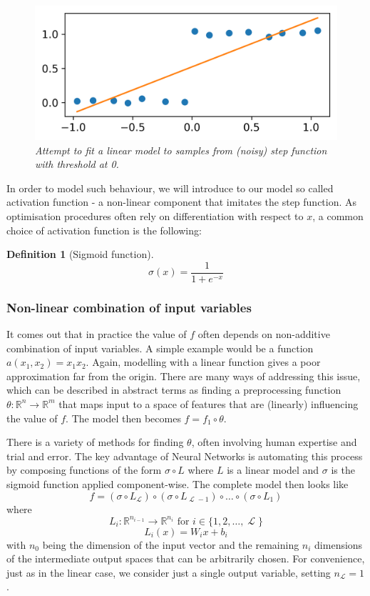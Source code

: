 \documentclass[a4paper,11pt]{article}
\theoremstyle{break}
\newtheorem{definition}{Definition}[section]
\newcommand{\R}{\mathbb{R}}
\DeclareMathOperator{\La}{\mathcal{L}}
\begin{document}
\begin{figure}[bph]
    \centering
    \includegraphics[width=0.4\linewidth]{step_linfit.png}
    \caption{\textit{Attempt to fit a linear model to samples from (noisy) step function with threshold at 0.}}
\end{figure}

In order to model such behaviour, we will introduce to our model so called activation function - a non-linear component  that imitates the step function. As optimisation procedures often rely on differentiation with respect to $x$, a common choice of activation function is the following:

\begin{definition}[Sigmoid function]
    $$ \sigma(x) = \frac{1}{1 + e^{-x}}$$
\end{definition}

 
\subsubsection{Non-linear combination of input variables}
It comes out that in practice the value of $f$ often depends on non-additive combination of input variables. A simple example would be a function $a(x_1, x_2) = x_1 x_2$. Again, modelling with a linear function gives a poor approximation far from the origin.
There are many ways of addressing this issue, which can be described in abstract terms as finding a preprocessing function $ \theta : \R^n \to \R^m$ that maps input to a space of features that are (linearly) influencing the value of $f$. The model then becomes $ f = f_1 \circ \theta $.

There is a variety of methods for finding $\theta$, often involving human expertise and trial and error. The key advantage of Neural Networks is automating this process by composing functions of the form $ \sigma \circ L$ where $L$ is a linear model and $\sigma$ is the sigmoid function applied component-wise.
The complete model then looks like
$$ f = (\sigma \circ L_{\La}) \circ (\sigma \circ L_{\La - 1}) \circ \ldots \circ (\sigma \circ L_{1}) $$
where
$$ L_i : \R^{n_{i-1}} \to \R^{n_{i}} \text{ for } i \in \{1, 2, \ldots, \La \} $$
$$ L_i(x) = W_i x + b_i $$
with $ n_0 $ being the dimension of the input vector and the remaining $ n_i $ dimensions of the intermediate output spaces that can be arbitrarily chosen. For convenience, just as in the linear case, we consider just a single output variable, setting $ n_{\La} = 1 $. 
\end{document}
